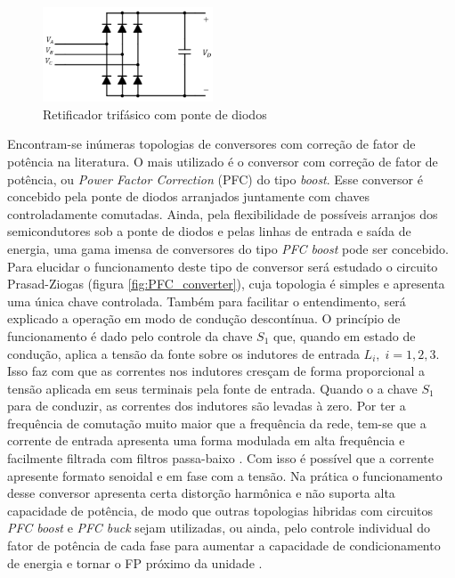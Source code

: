 \begin{figure}[!htbp] %
	\centering
	\includegraphics[width=0.45\textwidth]{Cap2/Figuras/3ph_rectifier.png}
	\caption{Retificador trifásico com ponte de diodos}
	\label{fig:3ph_rectifier}
\end{figure}

Encontram-se inúmeras topologias de conversores com correção de fator de potência na literatura. O mais utilizado é o conversor com correção de fator de potência, ou \textit{Power Factor Correction} (PFC) do tipo \textit{boost}. Esse conversor é concebido pela ponte de diodos arranjados juntamente com chaves controladamente comutadas. Ainda, pela flexibilidade de possíveis arranjos dos semicondutores sob a ponte de diodos e pelas linhas de entrada e saída de energia, uma gama imensa de conversores do tipo \textit{PFC boost} pode ser concebido. Para elucidar o funcionamento deste tipo de conversor será estudado o circuito Prasad-Ziogas (figura \ref{fig:PFC_converter}), cuja topologia é simples e apresenta uma única chave controlada. Também para facilitar o entendimento, será explicado a operação em modo de condução descontínua. O princípio de funcionamento é dado pelo controle da chave $S_1$ que, quando em estado de condução, aplica a tensão da fonte sobre os indutores de entrada $L_i,\;i=1,2,3$. Isso faz com que as correntes nos indutores cresçam de forma proporcional a tensão aplicada em seus terminais pela fonte de entrada. Quando o a chave $S_1$ para de conduzir, as correntes dos indutores são levadas à zero. Por ter a frequência de comutação muito maior que a frequência da rede, tem-se que a corrente de entrada apresenta uma forma modulada em alta frequência e facilmente filtrada com filtros passa-baixo \cite{Nairus1996, Takeuchi2008}. Com isso é possível que a corrente apresente formato senoidal e em fase com a tensão. Na prática o funcionamento desse conversor apresenta certa distorção harmônica e não suporta alta capacidade de potência, de modo que outras topologias hibridas com circuitos \textit{PFC boost} e \textit{PFC buck} sejam utilizadas, ou ainda, pelo controle individual do fator de potência de cada fase para aumentar a capacidade de condicionamento de energia e tornar o FP próximo da unidade \cite{Kolar2011}.

